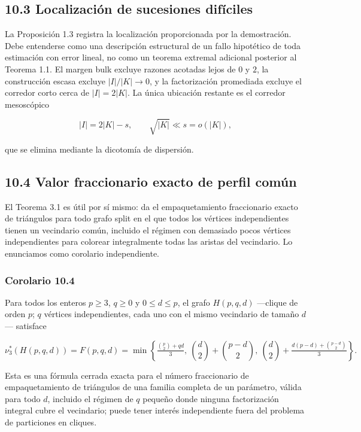 \documentclass[
  11pt,
]{article}
\begin{document}
\subsection{10.3 Localización de sucesiones
difíciles}\label{localizaciuxf3n-de-sucesiones-difuxedciles}

La Proposición 1.3 registra la localización proporcionada por la
demostración. Debe entenderse como una descripción estructural de un
fallo hipotético de toda estimación con error lineal, no como un teorema
extremal adicional posterior al Teorema 1.1. El margen bulk excluye
razones acotadas lejos de \(0\) y \(2\), la construcción escasa excluye
\(|I|/|K|\to0\), y la factorización promediada excluye el corredor corto
cerca de \(|I|=2|K|\). La única ubicación restante es el corredor
mesoscópico

\[
|I|=2|K|-s,
\qquad
\sqrt{|K|}\ll s=o(|K|),
\]

que se elimina mediante la dicotomía de dispersión.

\subsection{10.4 Valor fraccionario exacto de perfil
común}\label{valor-fraccionario-exacto-de-perfil-comuxfan}

El Teorema 3.1 es útil por sí mismo: da el empaquetamiento fraccionario
exacto de triángulos para todo grafo split en el que todos los vértices
independientes tienen un vecindario común, incluido el régimen con
demasiado pocos vértices independientes para colorear integralmente
todas las aristas del vecindario. Lo enunciamos como corolario
independiente.

\subsubsection{Corolario 10.4}\label{corolario-10.4-empaquetamiento-exacto-con-vecindario-comuxfan}

Para todos los enteros \(p\ge3\), \(q\ge0\) y \(0\le d\le p\), el grafo
\(H(p,q,d)\) ---clique de orden \(p\); \(q\) vértices independientes,
cada uno con el mismo vecindario de tamaño \(d\)--- satisface

\[
\nu_3^*(H(p,q,d))=F(p,q,d)=\min\left\{\tfrac{\binom p2+qd}{3},\ \binom d2+\binom{p-d}2,\ \binom d2+\tfrac{d(p-d)+\binom{p-d}2}{3}\right\}.
\]

Esta es una fórmula cerrada exacta para el número fraccionario de
empaquetamiento de triángulos de una familia completa de un parámetro,
válida para todo \(d\), incluido el régimen de \(q\) pequeño donde
ninguna factorización integral cubre el vecindario; puede tener interés
independiente fuera del problema de particiones en cliques.
\end{document}
